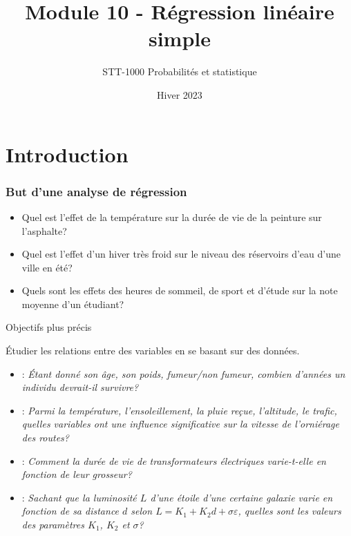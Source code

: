 \documentclass{BeamerTemplate}
\title{Module 10 - Régression linéaire simple}
\subtitle{STT-1000 Probabilités et statistique}
\date{Hiver 2023}
\begin{document}
\AtBeginSection{\frame{\sectionpage}}

\begin{frame}

\titlepage

\end{frame}

\section{Introduction}

\begin{frame}[t]
 \frametitle{But d'une analyse de régression}

{\small


\begin{itemize}\itemsep2mm
\item Quel est l'effet de la température sur la durée de vie  de la peinture sur l'asphalte?
\item Quel est l'effet d'un hiver très froid sur le niveau des réservoirs d'eau d'une ville en été?
\item Quels sont les effets des heures de sommeil, de sport et d'étude sur la note moyenne  d'un étudiant?
\end{itemize}
}
\end{frame}

\begin{frame}[t]{Objectifs plus précis}

{\small
Étudier les relations entre des variables en se basant sur des données}.

\begin{itemize}

\item {}: {\scriptsize {\it
Étant donné son âge, son poids, fumeur/non fumeur, combien
d'années un individu devrait-il survivre?}}

\item {}: {\scriptsize {\it
Parmi la température, l'ensoleillement, la pluie reçue,
l'altitude, le trafic,  quelles variables ont une influence
significative sur la vitesse de l'orniérage des routes?}}

\item {}: {\scriptsize {\it
Comment la durée de vie de transformateurs électriques varie-t-elle
en fonction de leur grosseur?}}

\item {}: {\scriptsize {\it
Sachant que la luminosité $L$ d'une étoile d'une certaine galaxie varie en fonction de sa
distance $d$ selon $L=K_1+K_2d+\sigma\varepsilon$, quelles sont les valeurs des paramètres
$K_1$, $K_2$ et $\sigma$?}}
\end{itemize}

\end{frame}
\end{document}
